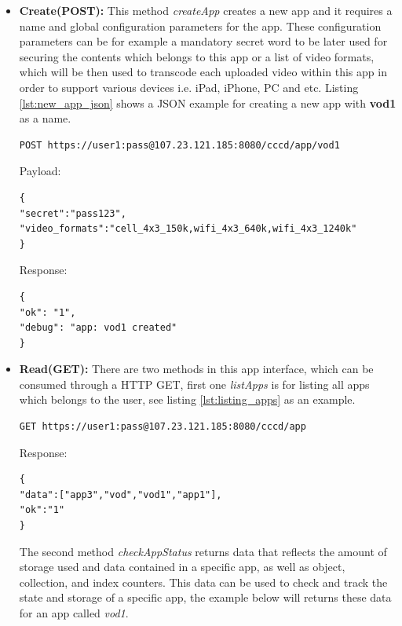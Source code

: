 \begin{itemize}
\item \textbf{Create(POST):} This method \textit{createApp} creates a new app and it requires a name and global configuration parameters for the app. These configuration parameters can be for example a mandatory secret word to be later used for securing the contents which belongs to this app or a list of video formats, which will be then used to transcode each uploaded video within this app in order to support various devices i.e. iPad, iPhone, PC and etc. Listing \ref{lst:new_app_json} shows a \ac{JSON} example for creating a new app with \textbf{vod1} as a name.

\begin{code}
\begin{verbatim}
POST https://user1:pass@107.23.121.185:8080/cccd/app/vod1
\end{verbatim}
Payload:
\begin{verbatim}
{
"secret":"pass123",
"video_formats":"cell_4x3_150k,wifi_4x3_640k,wifi_4x3_1240k"
}
\end{verbatim}
Response:
\begin{verbatim}
{
"ok": "1",
"debug": "app: vod1 created"
}
\end{verbatim}
\caption{Creating a new app}
\label{lst:new_app_json}
\end{code}

\item \textbf{Read(GET):} There are two methods in this app interface, which can be consumed through a \ac{HTTP} GET, first one \textit{listApps} is for listing all apps which belongs to the user, see listing \ref{lst:listing_apps} as an example. 

\begin{code}
\begin{verbatim}
GET https://user1:pass@107.23.121.185:8080/cccd/app
\end{verbatim}
Response:
\begin{verbatim}
{
"data":["app3","vod","vod1","app1"],
"ok":"1"
}
\end{verbatim}
\caption{Listing all apps which belong to a user}
\label{lst:listing_apps}
\end{code}


The second method \textit{checkAppStatus} returns data that reflects the amount of storage used and data contained in a specific app, as well as object, collection, and index counters. This data can be used to check and track the state and storage of a specific app, the example below will returns these data for an app called \textit{vod1}.


\end{itemize}
